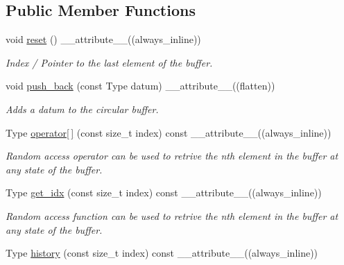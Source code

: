 \subsection*{Public Member Functions}
\begin{DoxyCompactItemize}
\item 
void \hyperlink{classSimpler__Circular__Buffer_a793cdb8134afe48ef9918fa0428dfbb6}{reset} () \+\_\+\+\_\+attribute\+\_\+\+\_\+((always\+\_\+inline))
\begin{DoxyCompactList}\small\item\em Index / Pointer to the last element of the buffer. \end{DoxyCompactList}\item 
void \hyperlink{classSimpler__Circular__Buffer_af4bdd0a6d3fc7a8c06f62b0d996158f0}{push\+\_\+back} (const Type datum) \+\_\+\+\_\+attribute\+\_\+\+\_\+((flatten))
\begin{DoxyCompactList}\small\item\em Adds a datum to the circular buffer. \end{DoxyCompactList}\item 
Type \hyperlink{classSimpler__Circular__Buffer_a4ce53bc8ad0d231e9d013c771191696a}{operator\mbox{[}$\,$\mbox{]}} (const size\+\_\+t index) const \+\_\+\+\_\+attribute\+\_\+\+\_\+((always\+\_\+inline))
\begin{DoxyCompactList}\small\item\em Random access operator can be used to retrive the nth element in the buffer at any state of the buffer. \end{DoxyCompactList}\item 
Type \hyperlink{classSimpler__Circular__Buffer_a6bdde2ca6c814ec455b8ffa190a90c1e}{get\+\_\+idx} (const size\+\_\+t index) const \+\_\+\+\_\+attribute\+\_\+\+\_\+((always\+\_\+inline))
\begin{DoxyCompactList}\small\item\em Random access function can be used to retrive the nth element in the buffer at any state of the buffer. \end{DoxyCompactList}\item 
Type \hyperlink{classSimpler__Circular__Buffer_afdd5b4da34472c721f46f354bfca2223}{history} (const size\+\_\+t index) const \+\_\+\+\_\+attribute\+\_\+\+\_\+((always\+\_\+inline))
\end{DoxyCompactItemize}
